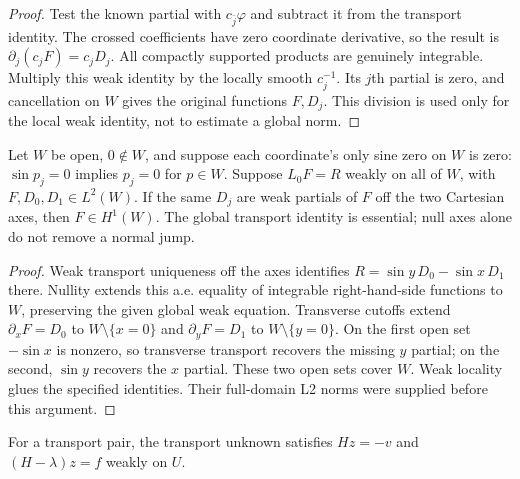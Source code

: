 \begin{proof}
\leanok
Test the known partial with $c_{\bar j}\varphi$ and subtract it from
the transport identity. The crossed coefficients have zero coordinate
derivative, so the result is
$\partial_j(c_jF)=c_jD_j$.
All compactly supported products are genuinely integrable.
Multiply this weak identity by the locally smooth $c_j^{-1}$.
Its $j$th partial is zero, and cancellation on $W$ gives the original
functions $F,D_j$. This division is used only for the local weak identity,
not to estimate a global norm.
\end{proof}

\begin{lemma}
\label{lem:transport-axis-h1-gluing}
\leanok
Let $W$ be open, $0\notin W$, and suppose each coordinate's only sine zero
on $W$ is zero: $\sin p_j=0$ implies $p_j=0$ for $p\in W$.
Suppose $L_0F=R$ weakly on all of $W$, with $F,D_0,D_1\in L^2(W)$.
If the same $D_j$ are weak partials of $F$ off the two Cartesian axes,
then $F\in H^1(W)$.
The global transport identity is essential; null axes alone do not remove
a normal jump.
\end{lemma}

\begin{proof}
\leanok
Weak transport uniqueness off the axes identifies
$R=\sin y\,D_0-\sin x\,D_1$ there. Nullity extends this a.e. equality of
integrable right-hand-side functions to $W$, preserving the given global
weak equation.
Transverse cutoffs extend $\partial_xF=D_0$ to $W\setminus\{x=0\}$ and
$\partial_yF=D_1$ to $W\setminus\{y=0\}$.
On the first open set $-\sin x$ is nonzero, so transverse transport recovers
the missing $y$ partial; on the second, $\sin y$ recovers the $x$ partial.
These two open sets cover $W$. Weak locality glues the specified identities.
Their full-domain L2 norms were supplied before this argument.
\end{proof}

\begin{lemma}
\label{lem:transport-unknown}
\leanok
For a transport pair, the transport unknown satisfies $Hz=-v$ and $(H-\lambda)z=f$
weakly on $U$.
\end{lemma}

